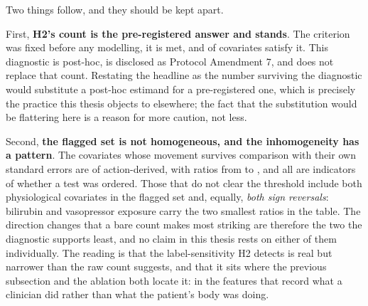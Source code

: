 \begin{table}[H]
    \centering\footnotesize\setlength{\tabcolsep}{4pt}
    \caption[H2 instability against estimation noise]{Each covariate flagged by
    H2, with its coefficient under each label variant, the difference between
    the two extremes, the pooled cluster-robust standard error of those two
    estimates, and their ratio. \pcHTwoNRobust{} of the \pcHTwoNFlagged{}
    flagged covariates move by more than roughly twice their pooled standard
    error; the remaining \pcHTwoNNoise{} move by less, the largest such ratio
    being \pcHTwoZMaxNoise. The separation is clean rather than marginal: no
    covariate falls between \pcHTwoZMaxNoise{} and \pcHTwoZMinRobust, so the
    split does not depend on where the cut is placed. ``Kind'' marks whether
    the covariate records clinician action or patient physiology
    (Section~\ref{sec:h2_action}). \textbf{This is a diagnostic, not a test}:
    the three fits share stays, so the estimates being differenced are
    correlated and the pooled standard error assumes they are not; and because
    the specification is ridge-penalised out of necessity, the covariance is
    that of the penalised estimator. No $p$-value is computed and none should
    be inferred from the ratio.}
    \label{tab:h2_uncertainty}
\end{table}

Two things follow, and they should be kept apart.

First, \textbf{H2's count is the pre-registered answer and stands}. The
criterion was fixed before any modelling, it is met, and
\pcHTwoEst{} of \pcHTwoNTerms{} covariates satisfy it. This diagnostic is
post-hoc, is disclosed as Protocol Amendment 7, and does not replace that
count. Restating the headline as the number surviving the diagnostic would
substitute a post-hoc estimand for a pre-registered one, which is precisely the
practice this thesis objects to elsewhere; the fact that the substitution would
be flattering here is a reason for more caution, not less.

Second, \textbf{the flagged set is not homogeneous, and the inhomogeneity has a
pattern}. The covariates whose movement survives comparison with their own
standard errors are \pcHTwoNRobustAction{} of \pcHTwoNRobust{} action-derived,
with ratios from \pcHTwoZMinRobust{} to \pcHTwoZMax, and all
\pcHTwoNRobust{} are indicators of whether a test was ordered. Those that do
not clear the threshold include both physiological covariates in the flagged
set and, equally, \emph{both sign reversals}: bilirubin and vasopressor
exposure carry the two smallest ratios in the table. The direction changes that
a bare count makes most striking are therefore the two the diagnostic supports
least, and no claim in this thesis rests on either of them individually. The
reading is that the label-sensitivity H2 detects is real but narrower than the
raw count suggests, and that it sits where the previous subsection and the
ablation both locate it: in the features that record what a clinician did
rather than what the patient's body was doing.

